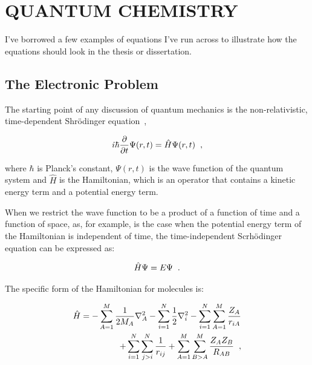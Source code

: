 \chapter{QUANTUM CHEMISTRY}%
\label{ch_QC}

I've borrowed a few examples of equations I've run across to illustrate how the equations should look in the thesis or dissertation. \cite{Agarwal06}

\section{The Electronic Problem}

The starting point of any discussion of quantum mechanics is the non-relativistic, time-dependent Shr\"{o}dinger equation~\cite{Sza89},

\begin{gather}
{\it i}\hbar\frac{\partial}{\partial t}\Psi(r,t)=\hat{H}\Psi(r,t)\hspace{0.2cm},
\end{gather}

\noindent where $\hbar$ is Planck's constant, $\Psi(r,t)$ is the wave function of the quantum system and $\hat{H}$ is the Hamiltonian, which is an operator that contains a kinetic energy term and a potential energy term.

When we restrict the wave function to be a product of a function of time and a function of space, as, for example, is the case when the potential energy term of the Hamiltonian is independent of time, the time-independent Scrh\"{o}dinger equation can be expressed as:

\begin{gather}
\hat{H}\Psi=E\Psi\hspace{0.2cm}.
\end{gather}

The specific form of the Hamiltonian for molecules is:

\begin{gather}
\label{molH}
{\begin{split}
\hat{H} =-\sum_{A=1}^{M} \frac{1}{2M_{A}} \nabla^{2}_{A} - \sum_{i=1}^{N} \frac{1}{2} \nabla^{2}_{i} - \sum_{i=1}^{N}\sum_{A=1}^{M}\frac{Z_{A}}{r_{iA}} \\
 + \sum_{i=1}^{N}\sum_{j>i}^{N} \frac{1}{r_{ij}} + \sum_{A=1}^{M}\sum_{B>A}^{M} \frac{Z_{A} Z_{B}}{R_{A B}}\hspace{0.2cm},
\end{split}}
\end{gather}

